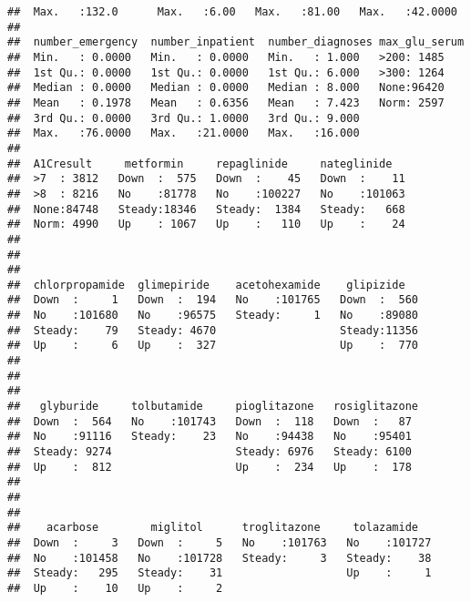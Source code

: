 \documentclass[
]{article}
\begin{document}
\begin{verbatim}
##  Max.   :132.0      Max.   :6.00   Max.   :81.00   Max.   :42.0000  
##                                                                     
##  number_emergency  number_inpatient  number_diagnoses max_glu_serum
##  Min.   : 0.0000   Min.   : 0.0000   Min.   : 1.000   >200: 1485   
##  1st Qu.: 0.0000   1st Qu.: 0.0000   1st Qu.: 6.000   >300: 1264   
##  Median : 0.0000   Median : 0.0000   Median : 8.000   None:96420   
##  Mean   : 0.1978   Mean   : 0.6356   Mean   : 7.423   Norm: 2597   
##  3rd Qu.: 0.0000   3rd Qu.: 1.0000   3rd Qu.: 9.000                
##  Max.   :76.0000   Max.   :21.0000   Max.   :16.000                
##                                                                    
##  A1Cresult     metformin     repaglinide     nateglinide    
##  >7  : 3812   Down  :  575   Down  :    45   Down  :    11  
##  >8  : 8216   No    :81778   No    :100227   No    :101063  
##  None:84748   Steady:18346   Steady:  1384   Steady:   668  
##  Norm: 4990   Up    : 1067   Up    :   110   Up    :    24  
##                                                             
##                                                             
##                                                             
##  chlorpropamide  glimepiride    acetohexamide    glipizide    
##  Down  :     1   Down  :  194   No    :101765   Down  :  560  
##  No    :101680   No    :96575   Steady:     1   No    :89080  
##  Steady:    79   Steady: 4670                   Steady:11356  
##  Up    :     6   Up    :  327                   Up    :  770  
##                                                               
##                                                               
##                                                               
##   glyburide     tolbutamide     pioglitazone   rosiglitazone 
##  Down  :  564   No    :101743   Down  :  118   Down  :   87  
##  No    :91116   Steady:    23   No    :94438   No    :95401  
##  Steady: 9274                   Steady: 6976   Steady: 6100  
##  Up    :  812                   Up    :  234   Up    :  178  
##                                                              
##                                                              
##                                                              
##    acarbose        miglitol      troglitazone     tolazamide    
##  Down  :     3   Down  :     5   No    :101763   No    :101727  
##  No    :101458   No    :101728   Steady:     3   Steady:    38  
##  Steady:   295   Steady:    31                   Up    :     1  
##  Up    :    10   Up    :     2                                  

\end{verbatim}
\end{document}
